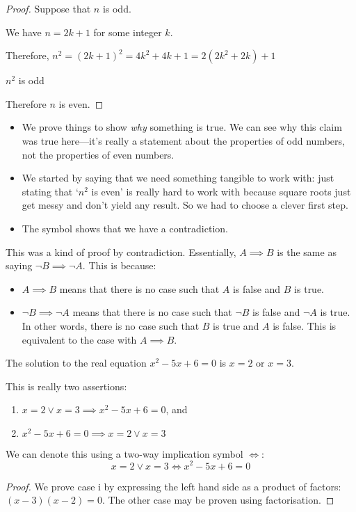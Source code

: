 \begin{proof}
	Suppose that \(n\) is odd.

	We have \(n = 2k+1\) for some integer \(k\).

	Therefore, \(n^2 = (2k+1)^2 = 4k^2 + 4k + 1 = 2(2k^2 + 2k) + 1\)

	\(n^2\) is odd \contradiction{}

	Therefore \(n\) is even.
\end{proof}
\begin{itemize}
	\item We prove things to show \textit{why} something is true.
	      We can see why this claim was true here---it's really a statement about the properties of odd numbers, not the properties of even numbers.
	\item We started by saying that we need something tangible to work with: just stating that `\(n^2\) is even' is really hard to work with because square roots just get messy and don't yield any result.
	      So we had to choose a clever first step.
	\item The symbol \contradiction{} shows that we have a contradiction.
\end{itemize}

This was a kind of proof by contradiction.
Essentially, \(A \implies B\) is the same as saying \(\neg B \implies \neg A\).
This is because:
\begin{itemize}
	\item \(A \implies B\) means that there is no case such that \(A\) is false and \(B\) is true.
	\item \(\neg B \implies \neg A\) means that there is no case such that \(\neg B\) is false and \(\neg A\) is true.
	      In other words, there is no case such that \(B\) is true and \(A\) is false.
	      This is equivalent to the case with \(A \implies B\).
\end{itemize}

\begin{claim}
	The solution to the real equation \(x^2-5x+6=0\) is \(x=2\) or \(x=3\).
\end{claim}
\begin{note}
	This is really two assertions:
	\begin{enumerate}
		\item \(x=2 \lor x=3 \implies x^2 - 5x + 6 = 0\), and
		\item \(x^2 - 5x + 6 = 0 \implies x=2 \lor x=3\)
	\end{enumerate}
	We can denote this using a two-way implication symbol \(\iff\):
	\[
		x=2 \lor x=3 \iff x^2 - 5x + 6 = 0
	\]
\end{note}
\begin{proof}
	We prove case i by expressing the left hand side as a product of factors: \((x-3)(x-2)=0\).
	The other case may be proven using factorisation.
\end{proof}

